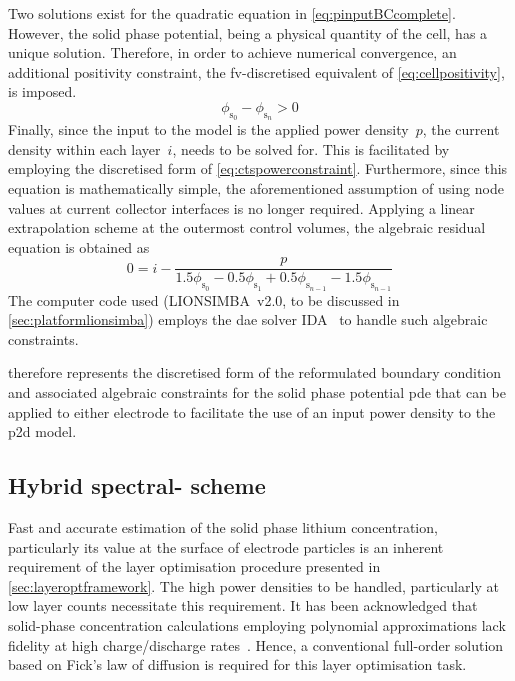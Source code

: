 
    Two     solutions     exist     for    the     quadratic     equation     in
    \cref{eq:pinputBCcomplete}.  However, the  solid  phase  potential, being  a
    physical quantity of the cell, has a unique solution. Therefore, in order to
    achieve  numerical convergence,  an  additional  positivity constraint,  the
    \gls{fv}-discretised equivalent of \cref{eq:cellpositivity}, is imposed.
    \begin{equation}\label{eq:discpositivity}
	    \phi_{\text{s}_0} - \phi_{\text{s}_n} > 0
    \end{equation}
    Finally,   since   the  input   to   the   model   is  the   applied   power
    density~$p$,  the  current  density  within  each  layer~$i$,  needs  to  be
    solved  for.  This   is  facilitated  by  employing   the  discretised  form
    of  \cref{eq:ctspowerconstraint}.   Furthermore,  since  this   equation  is
    mathematically simple, the aforementioned assumption of using node values at
    current  collector  interfaces is  no  longer  required. Applying  a  linear
    extrapolation  scheme  at  the  outermost  control  volumes,  the  algebraic
    residual equation is obtained as
    \begin{equation}\label{eq:currdensityresidual}
        0 = i - \frac{p}{1.5 \phi_{\mathrm{s}_0} - 0.5 \phi_{\mathrm{s}_1} + 0.5 \phi_{\mathrm{s}_{n-1}} - 1.5 \phi_{\mathrm{s}_{n-1}}}
    \end{equation}
    The    computer    code    used    (LIONSIMBA~v2.0,    to    be    discussed
    in    \cref{sec:platformlionsimba})    employs    the    \gls{dae}    solver
    IDA~\cite{sundials2005} to handle such algebraic constraints.

     therefore represents
    the discretised form  of the reformulated boundary  condition and associated
    algebraic constraints  for the solid  phase potential \gls{pde} that  can be
    applied to either electrode to facilitate  the use of an input power density
    to the \gls{p2d} model.

    \subsection{Hybrid spectral- scheme}\label{sec:hybridfv-spectral}

    Fast  and accurate  estimation  of the  solid  phase lithium  concentration,
    particularly  its  value  at  the  surface  of  electrode  particles  is  an
    inherent  requirement  of  the  layer optimisation  procedure  presented  in
    \cref{sec:layeroptframework}.  The  high  power  densities  to  be  handled,
    particularly  at  low layer  counts  necessitate  this requirement.  It  has
    been  acknowledged  that  solid-phase concentration  calculations  employing
    polynomial   approximations   lack   fidelity   at   high   charge/discharge
    rates~\cite{Santhanagopalan2006}. Hence, a  conventional full-order solution
    based on  Fick's law of  diffusion is  required for this  layer optimisation
    task.

